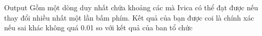 Output
Gồm một dòng duy nhất chứa khoảng các mà Ivica có thể đạt được nếu thay đổi nhiều nhất một lần bấm phím. Kết quả của bạn được coi là chính xác nếu sai khác không quá 0.01 so với kết quả của ban tổ chức